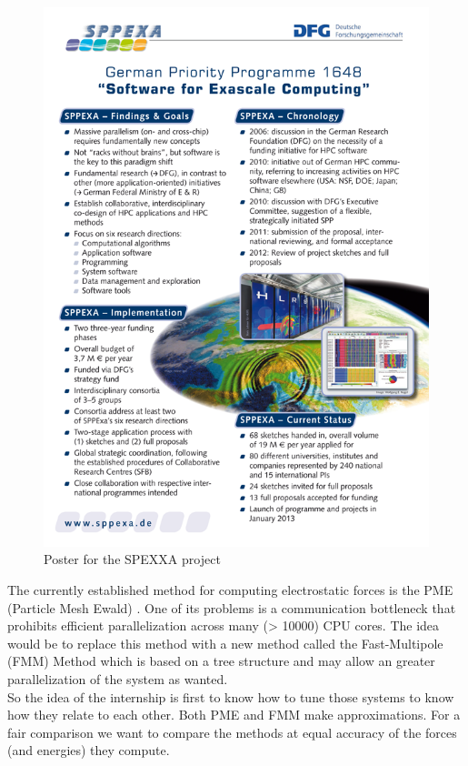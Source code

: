 \documentclass[10pt,twoside,a4paper]{report}
\begin{document}
\begin{figure}[H]
\includegraphics[scale=2]{sppexa-poster}
 \centering 
\caption{Poster for the SPEXXA project}
\label{fig:poster}
\end{figure}


The currently established method for computing electrostatic forces is the PME (Particle Mesh Ewald) \cite{darden1993particle}. One of its problems is a communication bottleneck that prohibits efficient parallelization across many (> 10000) CPU cores. The idea would be to replace this method with a new method called the Fast-Multipole (FMM) Method which is based on a tree structure and may allow an greater parallelization of the system as wanted.\\

So the idea of the internship is first to know how to tune those systems to know how they relate to each other. Both PME and FMM make approximations. For a fair comparison we want to compare the methods at equal accuracy of the forces (and energies) they compute. 
\end{document}
